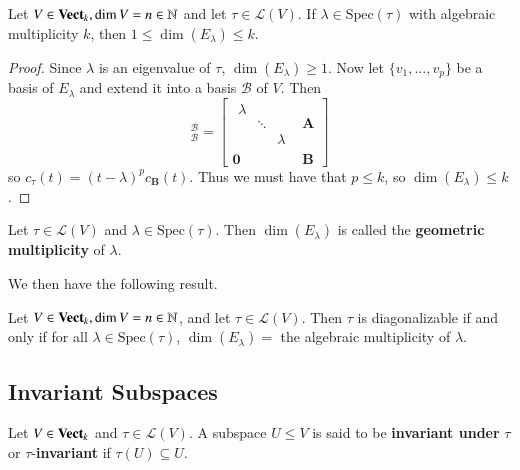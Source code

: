 \begin{theorem}
    Let $V \in \normalfont\textbf{Vect}_{k}, \dim V = n \in \mathbb N$ and let $\tau \in \mathcal{L}(V)$. If $\lambda \in \text{Spec}(\tau)$ with algebraic multiplicity $k$, then $1 \leq \dim(E_{\lambda}) \leq k$.
\end{theorem}
\begin{proof}
    Since $\lambda$ is an eigenvalue of $\tau$, $\dim(E_{\lambda}) \geq 1$. Now let $\{v_1,...,v_p\}$ be a basis of $E_{\lambda}$ and extend it into a basis $\mathcal{B}$ of $V$. Then \begin{equation*}
        [\tau]_{\mathcal{B}}^{\mathcal{B}} = \left[\begin{array}{c|c} \begin{array}{ccc} \lambda & & \\ & \ddots & \\ & & \lambda \end{array} & \mathbf{A} \\ \mathbf{0} & \mathbf{B} \end{array}\right]
    \end{equation*}
    so $c_{\tau}(t) = (t-\lambda)^pc_{\mathbf{B}}(t)$. Thus we must have that $p \leq k$, so $\dim(E_{\lambda}) \leq k$.
\end{proof}

\begin{definition}
    Let $\tau \in \mathcal{L}(V)$ and $\lambda \in \text{Spec}(\tau)$. Then $\dim(E_{\lambda})$ is called the \textbf{geometric multiplicity} of $\lambda$.
\end{definition}

We then have the following result.

\begin{theorem}
    Let $V \in \normalfont\textbf{Vect}_{k}, \dim V = n\in \mathbb N$, and let $\tau \in \mathcal{L}(V)$. Then $\tau$ is diagonalizable if and only if for all $\lambda \in \text{Spec}(\tau)$, $\dim(E_{\lambda}) = $ the algebraic multiplicity of $\lambda$.
\end{theorem}

\subsection{Invariant Subspaces}

\begin{definition}
    Let $V \in \normalfont\textbf{Vect}_{k}$ and $\tau \in \mathcal{L}(V)$. A subspace $U \leq V$ is said to be \textbf{invariant under} $\tau$ or $\tau$-\textbf{invariant} if $\tau(U) \subseteq U$.
\end{definition}

